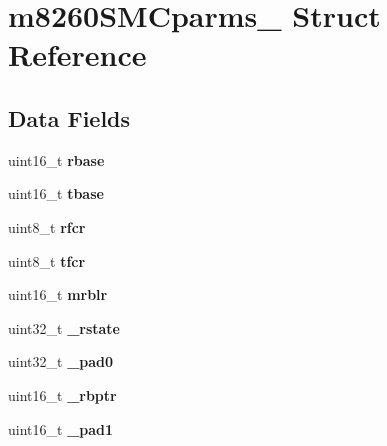 \hypertarget{structm8260SMCparms__}{}\section{m8260\+S\+M\+Cparms\+\_\+ Struct Reference}
\label{structm8260SMCparms__}
\subsection*{Data Fields}
\begin{DoxyCompactItemize}
\item 
\mbox{\label{structm8260SMCparms___a29883de1fc93d93ff57af63f34c40344}} 
uint16\+\_\+t {\bfseries rbase}
\item 
\mbox{\label{structm8260SMCparms___ae70410d624694537cf7740d6a90f7f67}} 
uint16\+\_\+t {\bfseries tbase}
\item 
\mbox{\label{structm8260SMCparms___aa90fd0c8d7aa64c6c21dc4dae5725d34}} 
uint8\+\_\+t {\bfseries rfcr}
\item 
\mbox{\label{structm8260SMCparms___a18783d1c7657bbc9b46cec921fa67f03}} 
uint8\+\_\+t {\bfseries tfcr}
\item 
\mbox{\label{structm8260SMCparms___a6a3705a3eb5c20a0f4ba3346680f082b}} 
uint16\+\_\+t {\bfseries mrblr}
\item 
\mbox{\label{structm8260SMCparms___a95d947826d2d66eec583e3c2e5bfd330}} 
uint32\+\_\+t {\bfseries \+\_\+rstate}
\item 
\mbox{\label{structm8260SMCparms___aa48ce0538a7881be2b001caaf890c825}} 
uint32\+\_\+t {\bfseries \+\_\+pad0}
\item 
\mbox{\label{structm8260SMCparms___a7cd756727ba6bb48f9330e45ec681a6c}} 
uint16\+\_\+t {\bfseries \+\_\+rbptr}
\item 
\mbox{\label{structm8260SMCparms___a3b9e43fb760c7a5d91e3afc5614977d4}} 
uint16\+\_\+t {\bfseries \+\_\+pad1}
\item 

\end{DoxyCompactItemize}
